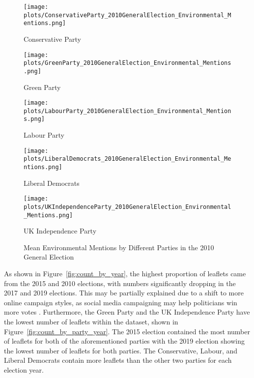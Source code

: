 \documentclass[12pt,letterpaper]{article}
\begin{document}
\begin{figure}[H] %
	\centering
	
	\begin{minipage}[t]{0.335\textwidth}
		\centering
		\texttt{[image: plots/ConservativeParty\_2010GeneralElection\_Environmental\_Mentions.png]}
		\caption{Conservative Party}
	\end{minipage}\hfill
	\begin{minipage}[t]{0.335\textwidth}
		\centering
		\texttt{[image: plots/GreenParty\_2010GeneralElection\_Environmental\_Mentions.png]}
		\caption{Green Party}
	\end{minipage}\hfill
	\begin{minipage}[t]{0.335\textwidth}
		\centering
		\texttt{[image: plots/LabourParty\_2010GeneralElection\_Environmental\_Mentions.png]}
		\caption{Labour Party}
	\end{minipage}
	
	\vspace{0.1cm} %
	
	\begin{minipage}[t]{0.335\textwidth}
		\centering
		\texttt{[image: plots/LiberalDemocrats\_2010GeneralElection\_Environmental\_Mentions.png]}
		\caption{Liberal Democrats}
	\end{minipage}\hfill
	\begin{minipage}[t]{0.335\textwidth}
		\centering
		\texttt{[image: plots/UKIndependenceParty\_2010GeneralElection\_Environmental\_Mentions.png]}
		\caption{UK Independence Party}
	\end{minipage}
	
	\caption{Mean Environmental Mentions by Different Parties in the 2010 General Election}
	\label{fig:parties_environmental_mentions}
\end{figure}



As shown in Figure~\ref{fig:count_by_year}, the highest proportion of leaflets came from the 2015 and 2010 elections, with numbers significantly dropping in the 2017 and 2019 elections. This may be partially explained due to a shift to more online campaign styles, as social media campaigning may help politicians win more votes \autocite{brightDoesCampaigningSocial2020}. Furthermore, the Green Party and the UK Independence Party have the lowest number of leaflets within the dataset, shown in Figure~\ref{fig:count_by_party_year}. The 2015 election contained the most number of leaflets for both of the aforementioned parties with the 2019 election showing the lowest number of leaflets for both parties. The Conservative, Labour, and Liberal Democrats contain more leaflets than the other two parties for each election year.  
\end{document}
